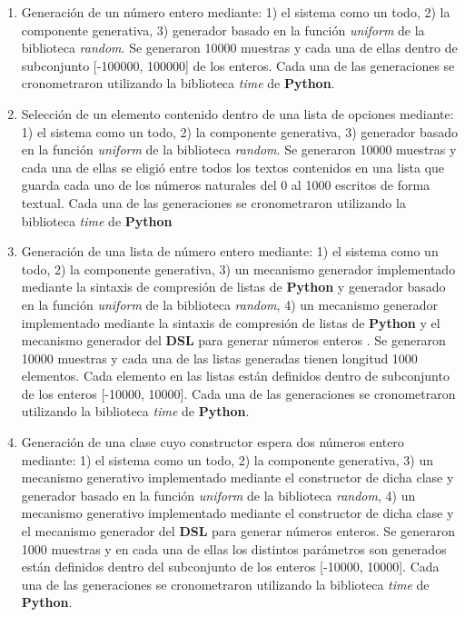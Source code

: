 \begin{enumerate}
      \item Generación de un número entero mediante: 1) el sistema como un todo, 2) la componente generativa, 3) generador basado en la función {\it uniform} de la
            biblioteca {\it random}. Se generaron 10000 muestras y cada una de ellas dentro de subconjunto [-100000, 100000] de los enteros.
            Cada una de las generaciones se cronometraron utilizando la biblioteca {\it time} de {\bf Python}.
      \item Selección de un elemento contenido dentro de una lista de opciones mediante: 1) el sistema como un todo, 2) la componente generativa,
            3) generador basado en la función {\it uniform} de la biblioteca {\it random}. Se generaron 10000 muestras y cada una de ellas se eligió entre
            todos los textos contenidos en una lista que guarda cada uno de los números naturales del 0 al 1000 escritos de forma textual. Cada una de las
            generaciones se cronometraron utilizando la biblioteca {\it time} de {\bf Python}
      \item Generación de una lista de número entero mediante: 1) el sistema como un todo, 2) la componente generativa, 3) un mecanismo generador
            implementado mediante la sintaxis de compresión de listas de {\bf Python} y generador basado en la función {\it uniform} de la biblioteca {\it random},
            4) un mecanismo generador implementado mediante la sintaxis de compresión de listas de {\bf Python} y el mecanismo generador del
                  {\bf DSL} para generar números enteros . Se generaron 10000 muestras y cada una de las listas generadas tienen longitud 1000 elementos.
            Cada elemento en las listas están definidos dentro de subconjunto de los enteros [-10000, 10000]. Cada una de las generaciones se cronometraron utilizando la
            biblioteca {\it time} de {\bf Python}.
      \item Generación de una clase cuyo constructor espera dos números entero mediante: 1) el sistema como un todo, 2) la componente generativa,
            3) un mecanismo generativo implementado mediante el constructor de dicha clase y generador basado en la función {\it uniform} de la biblioteca {\it random}, 4) un
            mecanismo generativo implementado mediante el constructor de dicha clase y el mecanismo generador del {\bf DSL} para generar números enteros.
            Se generaron 1000 muestras y en cada una de ellas los distintos parámetros son generados están definidos dentro del subconjunto de los
            enteros [-10000, 10000]. Cada una de las generaciones se cronometraron utilizando la biblioteca {\it time} de {\bf Python}.
\end{enumerate}

